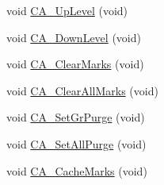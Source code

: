 \begin{DoxyCompactItemize}
void \hyperlink{ID__CA_8C_a05669e481a711870643e4c9cb2c00c93}{CA\_\-UpLevel} (void)
\item 
void \hyperlink{ID__CA_8C_ab0634ac6163eb8b9e51839469f094bc4}{CA\_\-DownLevel} (void)
\item 
void \hyperlink{ID__CA_8C_aadc64e6b6e9b1c11f2dd11282662572e}{CA\_\-ClearMarks} (void)
\item 
void \hyperlink{ID__CA_8C_af52e0508cf825cf10a933d377abe764d}{CA\_\-ClearAllMarks} (void)
\item 
void \hyperlink{ID__CA_8C_aa71d55f13e89f4276b8ff1d161a51815}{CA\_\-SetGrPurge} (void)
\item 
void \hyperlink{ID__CA_8C_a20eee13eb260608d4612aafc05ffc246}{CA\_\-SetAllPurge} (void)
\item 
void \hyperlink{ID__CA_8C_a258ef34640d9cb05e8a1e6c4e2f8eb5b}{CA\_\-CacheMarks} (void)
\end{DoxyCompactItemize}
